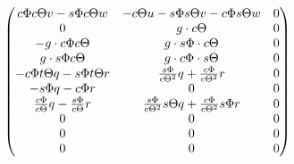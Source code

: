 \begin{align*}
\begin{pmatrix}
c{\Phi}c{\Theta} v - s{\Phi}c{\Theta} w & -c{\Theta} u - s{\Phi}s{\Theta} v - c{\Phi}s{\Theta} w & 0  
\\
0 & g \cdot c{\Theta} & 0 
\\
-g \cdot c{\Phi} c{\Theta} & g \cdot s{\Phi} \cdot c{\Theta} & 0 
\\
g \cdot s{\Phi} c{\Theta} & g \cdot c{\Phi} \cdot s{\Theta} & 0 
\\
-c{\Phi} t\Theta q - s{\Phi} t\Theta r & \frac{s{\Phi}}{c{\Theta}^2} q + \frac{c{\Phi}}{c{\Theta}^2} r & 0 
\\
-s{\Phi} q- c{\Phi} r& 0 & 0 
\\
\frac{c{\Phi}}{c{\Theta}} q - \frac{s{\Phi}}{c{\Theta}} r & \frac{s{\Phi}}{c{\Theta}^2} s{\Theta} q + \frac{c{\Phi}}{c{\Theta} ^2 } s{\Phi} r & 0 
\\
0 & 0 & 0 
\\
0 & 0 & 0  
\\
0 & 0 & 0  
\end{pmatrix}
\end{align*}

